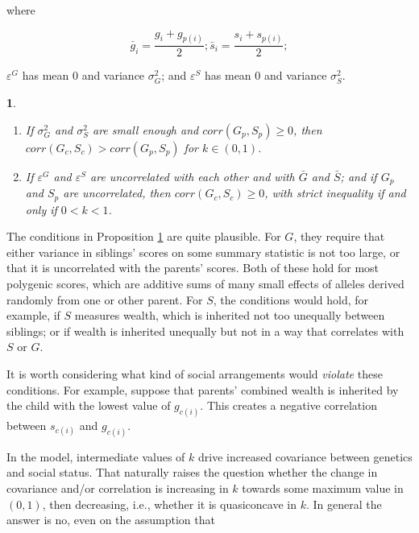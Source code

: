\documentclass[
]{article}
\newtheorem{prop}{\protect\propositionname}
\providecommand{\propositionname}{Proposition}
\begin{document}
where

\[
\bar{g}_{i} = \frac{g_{i} + g_{p(i)}}{2}; \bar{s}_{i} = \frac{s_{i} + s_{p(i)}}{2};
\]

\(\varepsilon^{G}\) has mean 0 and variance \(\sigma_{G}^{2}\); and
\(\varepsilon^{S}\) has mean 0 and variance \(\sigma_{S}^{2}\).

\begin{prop}
\label{prop:robustness}

\begin{enumerate}

\item If $\sigma_{G}^{2}$ and $\sigma_{S}^{2}$ are small enough and $corr(G_{p},S_{p}) \ge 0$,
then $corr(G_{c},S_{c}) > corr(G_{p},S_{p})$ for $k \in (0,1)$.

\item If $\varepsilon^{G}$ and $\varepsilon^{S}$ are uncorrelated with
each other and with $\bar{G}$ and $\bar{S}$; and if $G_{p}$ and
$S_{p}$ are uncorrelated, then $corr(G_{c},S_{c}) \ge 0$, with strict
inequality if and only if $0<k<1$.

\end{enumerate}

\end{prop}

The conditions in Proposition \ref{prop:robustness} are quite plausible.
For \(G\), they require that either variance in siblings' scores on some
summary statistic is not too large, or that it is uncorrelated with the
parents' scores. Both of these hold for most polygenic scores, which are
additive sums of many small effects of alleles derived randomly from one
or other parent. For \(S\), the conditions would hold, for example, if \(S\)
measures wealth, which is inherited not too unequally between siblings;
or if wealth is inherited unequally but not in a way that correlates
with \(S\) or \(G\).

It is worth considering what kind of social arrangements would \emph{violate}
these conditions. For example, suppose that parents' combined wealth is
inherited by the child with the lowest value of \(g_{c(i)}\). This creates
a negative correlation between \(s_{c(i)}\) and \(g_{c(i)}\).

In the model, intermediate values of \(k\) drive increased covariance
between genetics and social status. That naturally raises the question
whether the change in covariance and/or correlation is increasing in \(k\)
towards some maximum value in \((0,1)\), then decreasing, i.e., whether it
is quasiconcave in \(k\). In general the answer is no, even on the
assumption that
\end{document}
